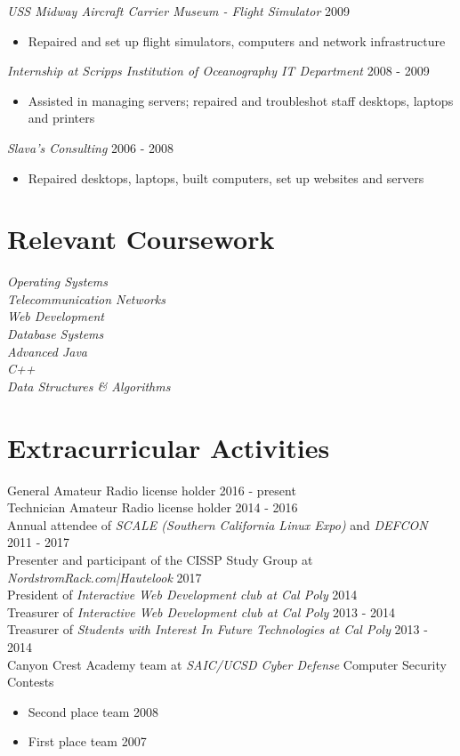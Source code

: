 \documentclass[line]{tex/res}
\begin{document}
\begin{resume}
    {\sl USS Midway Aircraft Carrier Museum - Flight Simulator} \hfill 2009
    \begin{itemize} \itemsep -2pt
        \item Repaired and set up flight simulators, computers and network infrastructure
    \end{itemize}

    {\sl Internship at Scripps Institution of Oceanography IT Department} \hfill 2008 - 2009
    \begin{itemize} \itemsep -2pt
        \item Assisted in managing servers; repaired and troubleshot staff desktops, laptops and printers
    \end{itemize}

    {\sl Slava's Consulting} \hfill 2006 - 2008
    \begin{itemize} \itemsep -2pt
        \item Repaired desktops, laptops, built computers, set up websites and servers
    \end{itemize}

\section{Relevant Coursework}
    {\sl Operating Systems } \\
    {\sl Telecommunication Networks } \\
    {\sl Web Development } \\
    {\sl Database Systems } \\
    {\sl Advanced Java} \\
    {\sl C++} \\
    {\sl Data Structures \& Algorithms}

\section{Extracurricular Activities}
    General Amateur Radio license holder \hfill 2016 - present \\
    Technician Amateur Radio license holder \hfill 2014 - 2016 \\
    Annual attendee of {\it SCALE (Southern California Linux Expo)} and {\it DEFCON} \hfill 2011 - 2017 \\
    Presenter and participant of the CISSP Study Group at {\it NordstromRack.com|Hautelook} \hfill 2017 \\
    President of {\it Interactive Web Development club at Cal Poly} \hfill 2014 \\
    Treasurer of {\it Interactive Web Development club at Cal Poly} \hfill 2013 - 2014 \\
    Treasurer of {\it Students with Interest In Future Technologies at Cal Poly} \hfill 2013 - 2014 \\
    Canyon Crest Academy team at {\it SAIC/UCSD Cyber Defense} Computer Security Contests
    \begin{itemize} \itemsep -2pt
        \item Second place team \hfill 2008
        \item First place team \hfill 2007
    \end{itemize}

\end{resume}
\end{document}
